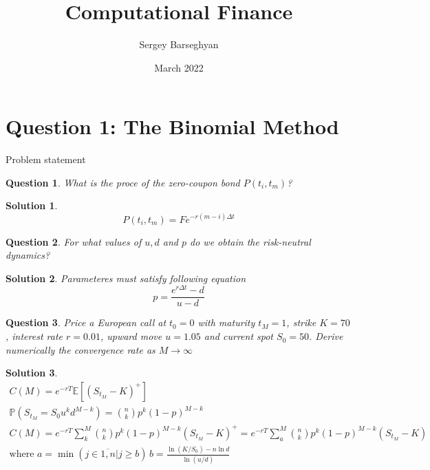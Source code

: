 \documentclass[16pt]{article}
\title{Computational Finance}
\author{Sergey Barseghyan}
\date{March 2022}
\newtheorem{qu}{Question}[section]
\newtheorem{sol}{Solution}[section]
\begin{document}
	
	\maketitle
	
	\section{Question 1: The Binomial Method}
	
	Problem statement
	
	\begin{qu}
		What is the proce of the zero-coupon bond $P(t_{i}, t_{m})$?
	\end{qu}
	
	\begin{sol}
		\begin{equation}
			P(t_{i}, t_{m}) = F e ^ {- r \left(m - i\right) \Delta t}
		\end{equation}
	\end{sol}
	
	\begin{qu}
		For what values of $u, d$ and $p$ do we obtain the risk-neutral dynamics?
	\end{qu}
	
	\begin{sol}
		
		
		Parameteres must satisfy following equation
		\begin{equation}
			p = \frac{e^{r\Delta t} - d}{u - d}
		\end{equation}
		
	\end{sol}

	\begin{qu}
		Price a European call at $t_0 = 0$ with maturity $t_{M} = 1$, strike $K = 70$, interest
		rate $r = 0.01$, upward move $u = 1.05$ and current spot $S_0 = 50$. Derive
		numerically the convergence rate as $M \rightarrow \infty$
	\end{qu}

	\begin{sol}
		\begin{align*}
			C(M) = e^{-r T}\mathbb{E}\left[\left(S_{t_{M}} - K\right)^{+}\right]\\
			\mathbb{P}\left(S_{t_M} = S_0 u^k d^{M - k}\right) = \binom{n}{k}p^k (1 - p)^{M-k} \\
			C(M) = e^{-r T}\sum^{M}_{k}\binom{n}{k}p^k (1 - p)^{M-k}\left(S_{t_{M}} - K\right)^{+} = e^{-r T}\sum^{M}_{a}\binom{n}{k}p^k (1 - p)^{M-k}\left(S_{t_{M}} - K\right) \\
			\text{where } a  = \min\left(j \in \overline{1,n}\vert j \ge b\right) \,
			b = \frac{\ln{(K/S_0)} - n \ln{d}}{\ln{(u/d)}}
		\end{align*}
	\end{sol}
\end{document}
